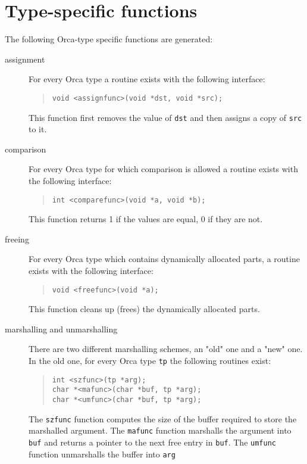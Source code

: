 \documentclass[10pt]{article}
\begin{document}
\section{Type-specific functions}\label{sec:tpspec}
The following Orca-type specific functions are generated:
\begin{description}
\item[assignment]
For every Orca type a routine exists with the following interface:
\begin{quote}
\begin{verbatim}
void <assignfunc>(void *dst, void *src);
\end{verbatim}
\end{quote}
This function first removes the value of \verb+dst+ and then assigns
a copy of \verb+src+ to it.
\item[comparison]
For every Orca type for which comparison is allowed a routine exists
with the following interface:
\begin{quote}
\begin{verbatim}
int <comparefunc>(void *a, void *b);
\end{verbatim}
\end{quote}
This function returns 1 if the values are equal, 0 if they are not.
\item[freeing]
For every Orca type which contains dynamically allocated parts, a routine
exists with the following interface:
\begin{quote}
\begin{verbatim}
void <freefunc>(void *a);
\end{verbatim}
\end{quote}
This function cleans up (frees) the dynamically allocated parts.
\item[marshalling and unmarshalling]
There are two different marshalling schemes, an "old" one and a "new" one.
In the old one, for every Orca type \verb+tp+ the following routines exist:
\begin{quote}
\begin{verbatim}
int <szfunc>(tp *arg);
char *<mafunc>(char *buf, tp *arg);
char *<umfunc>(char *buf, tp *arg);
\end{verbatim}
\end{quote}
The \verb+szfunc+
function computes the size of the buffer required to store
the marshalled argument.
The \verb+mafunc+ function marshalls the argument into \verb+buf+ and
returns a pointer to the next free entry in \verb+buf+.
The \verb+umfunc+
function unmarshalls the buffer into \verb+arg+

\end{description}
\end{document}
